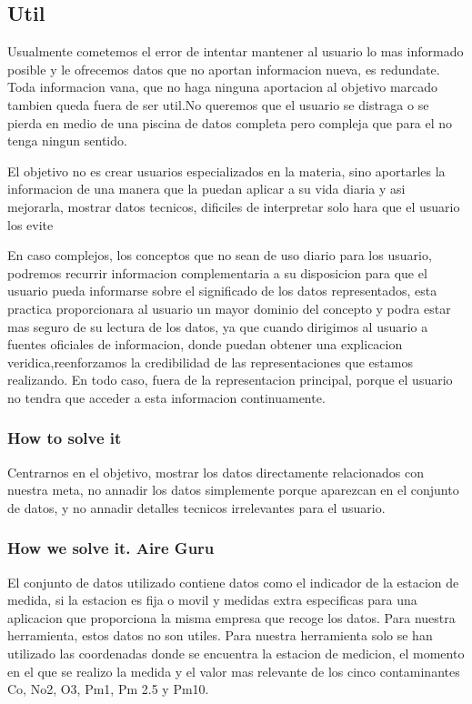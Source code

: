 \subsection{Util}
Usualmente cometemos el error de intentar mantener al usuario lo mas informado posible y le ofrecemos datos que
no aportan informacion nueva, es redundate. Toda informacion vana, que no haga ninguna aportacion
al objetivo marcado tambien queda fuera de ser util.No queremos que el usuario se distraga o se pierda en medio
 de una piscina de datos completa pero compleja que para el no tenga ningun sentido. 

El objetivo no es crear usuarios especializados en la materia, sino aportarles la
informacion de una manera que la puedan aplicar a su vida diaria y asi mejorarla, mostrar datos
tecnicos, dificiles de interpretar solo hara que el usuario los evite

En caso complejos, los conceptos que no sean de uso diario para los usuario, podremos recurrir informacion
complementaria a su disposicion para que el usuario pueda informarse sobre el significado de los datos 
representados, esta practica proporcionara al usuario un mayor dominio del concepto y podra estar mas
seguro de su lectura de los datos, ya que cuando dirigimos al usuario a fuentes oficiales de informacion, donde puedan 
obtener una explicacion veridica,reenforzamos la credibilidad de las representaciones que estamos realizando. En todo caso, 
fuera de la representacion principal, porque el usuario no tendra que acceder a esta informacion continuamente.

\subsubsection{How to solve it} 
Centrarnos en el objetivo, mostrar los datos directamente relacionados con nuestra meta, no annadir los datos 
simplemente porque aparezcan en el conjunto de datos, y no annadir detalles tecnicos irrelevantes para el usuario.


\subsubsection{How we solve it. Aire Guru} 

El conjunto de datos utilizado contiene datos como el indicador de la estacion de medida, si la estacion es fija o movil
y medidas extra especificas para una aplicacion que proporciona la misma empresa que recoge los datos. Para nuestra
herramienta, estos datos no son utiles.
Para nuestra herramienta solo se han utilizado las coordenadas donde se encuentra la estacion de medicion, el momento en 
el que se realizo la medida y el valor mas relevante de los cinco contaminantes Co, No2, O3, Pm1, Pm 2.5 y Pm10.

